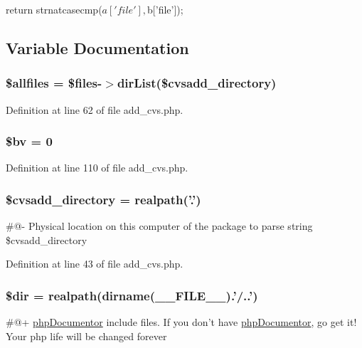 \begin{DoxyCode}
{
        return strnatcasecmp($a['file'],$b['file']);
}
\end{DoxyCode}


\subsection{\-Variable \-Documentation}
\hypertarget{add__cvs_8php_a317db37d61abc676aabe0215d0cc85ba}{
\subsubsection[{\$allfiles}]{\setlength{\rightskip}{0pt plus 5cm}\$allfiles = \$files-\/$>$dir\-List(\$cvsadd\-\_\-directory)}}\label{add__cvs_8php_a317db37d61abc676aabe0215d0cc85ba}


\-Definition at line 62 of file add\-\_\-cvs.\-php.

\hypertarget{add__cvs_8php_add760c5c5215dc93f82ab02cfcb3cdb3}{
\subsubsection[{\$bv}]{\setlength{\rightskip}{0pt plus 5cm}\$bv = 0}}\label{add__cvs_8php_add760c5c5215dc93f82ab02cfcb3cdb3}


\-Definition at line 110 of file add\-\_\-cvs.\-php.

\hypertarget{add__cvs_8php_af958dfa89721831bb67186f8f21d3ac2}{
\subsubsection[{\$cvsadd\-\_\-directory}]{\setlength{\rightskip}{0pt plus 5cm}\$cvsadd\-\_\-directory = realpath('.')}}\label{add__cvs_8php_af958dfa89721831bb67186f8f21d3ac2}
\#@-\/ \-Physical location on this computer of the package to parse  string \$cvsadd\-\_\-directory 

\-Definition at line 43 of file add\-\_\-cvs.\-php.

\hypertarget{add__cvs_8php_a1659f0a629d408e0f849dbe4ee061e62}{
\subsubsection[{\$dir}]{\setlength{\rightskip}{0pt plus 5cm}\$dir = realpath(dirname(\-\_\-\-\_\-\-F\-I\-L\-E\-\_\-\-\_\-).'/..')}}\label{add__cvs_8php_a1659f0a629d408e0f849dbe4ee061e62}
\#@+ \hyperlink{namespacephp_documentor}{php\-Documentor} include files. \-If you don't have \hyperlink{namespacephp_documentor}{php\-Documentor}, go get it! \-Your php life will be changed forever 

